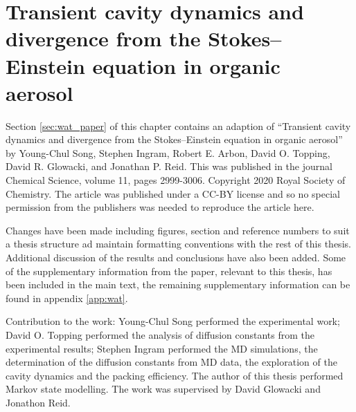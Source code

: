 %
%
\let\textcircled=\pgftextcircled
\chapter{Transient cavity dynamics and divergence from the Stokes–Einstein equation in organic aerosol}
\label{chap:water}


Section \ref{sec:wat_paper} of this chapter contains an adaption of ``Transient cavity dynamics and divergence from the Stokes–Einstein equation in organic aerosol'' by Young-Chul Song, Stephen Ingram, Robert E. Arbon, David O. Topping, David R. Glowacki, and Jonathan P. Reid. This was published in the journal Chemical Science, volume 11, pages 2999-3006. Copyright 2020 Royal Society of Chemistry. The article was published under a CC-BY license and so no special permission from the publishers was needed to reproduce the article here.  

Changes have been made including figures, section and reference numbers to suit a thesis structure ad maintain formatting conventions with the rest of this thesis. Additional discussion of the results and conclusions have also been added. Some of the supplementary information from the paper, relevant to this thesis, has  been included in the main text, the remaining supplementary information can be found in appendix \ref{app:wat}. 

Contribution to the work: Young-Chul Song performed the experimental work; David O. Topping performed the analysis of diffusion constants from the experimental results; Stephen Ingram performed the MD simulations, the determination of the diffusion constants from MD data, the exploration of the cavity dynamics and the packing efficiency.  The author of this thesis performed Markov state modelling. The work was supervised by David Glowacki and Jonathon Reid. 



